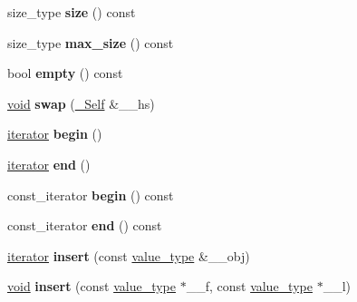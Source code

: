 \begin{DoxyCompactItemize}
\item 
\mbox{\label{classhash__multimap_a965ed482731f713569c82c550452bea6}} 
size\+\_\+type {\bfseries size} () const
\item 
\mbox{\label{classhash__multimap_a20565dcddefc4a2da5bc8bc4bb566d8b}} 
size\+\_\+type {\bfseries max\+\_\+size} () const
\item 
\mbox{\label{classhash__multimap_ac0d111449b6018fdf0093a6aa81338b8}} 
bool {\bfseries empty} () const
\item 
\mbox{\label{classhash__multimap_a9568f1ea7f359875816633e963eb1509}} 
\hyperlink{interfacevoid}{void} {\bfseries swap} (\hyperlink{classhash__multimap}{\+\_\+\+Self} \&\+\_\+\+\_\+hs)
\item 
\mbox{\label{classhash__multimap_ad2f6ec15826af8befad0148a86f2d303}} 
\hyperlink{structiterator}{iterator} {\bfseries begin} ()
\item 
\mbox{\label{classhash__multimap_ad893caaafba6ad6c96c8155ec09b9645}} 
\hyperlink{structiterator}{iterator} {\bfseries end} ()
\item 
\mbox{\label{classhash__multimap_a70cdfc80dc301f302bf33b74f37e27a8}} 
const\+\_\+iterator {\bfseries begin} () const
\item 
\mbox{\label{classhash__multimap_a0380d1f6d3c6d96aba974541150c01ad}} 
const\+\_\+iterator {\bfseries end} () const
\item 
\mbox{\label{classhash__multimap_a267b9d57038cac6290998506f27a187d}} 
\hyperlink{structiterator}{iterator} {\bfseries insert} (const \hyperlink{structpair}{value\+\_\+type} \&\+\_\+\+\_\+obj)
\item 
\mbox{\label{classhash__multimap_aa4ea3616ac3d8057b48a9682a071dc03}} 
\hyperlink{interfacevoid}{void} {\bfseries insert} (const \hyperlink{structpair}{value\+\_\+type} $\ast$\+\_\+\+\_\+f, const \hyperlink{structpair}{value\+\_\+type} $\ast$\+\_\+\+\_\+l)
\item 

\end{DoxyCompactItemize}
